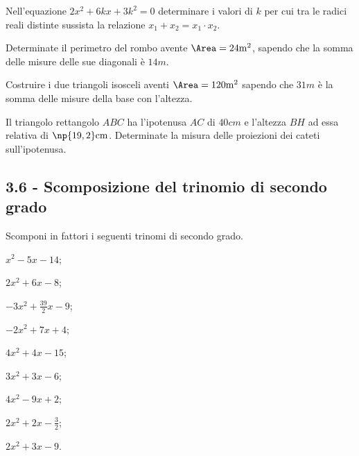 \begin{esercizio}[\Ast]
 \label{ese:3.90}
Nell'equazione $2 x^{2} + 6 k x + 3 k^{2} = 0$ determinare i valori di $k$ per cui tra le radici reali distinte sussista la relazione $x_{1} + x_{2} = x_{1} \cdot x_{2}$.
\end{esercizio}

\begin{esercizio}[\Ast]
 \label{ese:3.91}
Determinate il perimetro del rombo avente $\Area = 24\unit{m^{2}}$, sapendo che la somma delle misure delle sue diagonali è $14\unit{m}$.
\end{esercizio}

\begin{esercizio}
\label{ese:3.92}
Costruire i due triangoli isosceli aventi $\Area = 120\unit{m^{2}}$ sapendo che $31\unit{m}$ è la somma delle misure della base con l'altezza.
\end{esercizio}

\begin{esercizio}
 \label{ese:3.93}
Il triangolo rettangolo $ABC$ ha l'ipotenusa $AC$ di $40\unit{cm}$ e l'altezza $BH$ ad essa relativa di $\np{19,2}\unit{cm}$. Determinate la misura delle proiezioni dei cateti sull'ipotenusa.
\end{esercizio}

\subsection*{3.6 - Scomposizione del trinomio di secondo grado}

\begin{esercizio}[\Ast]
 \label{ese:3.94}
Scomponi in fattori i seguenti trinomi di secondo grado.
\begin{multicols}{3}
\begin{enumeratea}
\item $x^{2}-5 x-14$;
\item $2 x^{2} + 6 x-8$;
\item $- 3 x^{2} + \frac{39}{2} x-9$;
\item $- 2 x^{2} + 7 x + 4$;
\item $4 x^{2} + 4 x-15$;
\item $3 x^{2} + 3 x-6$;
\item $4 x^{2}-9 x + 2$;
\item $2 x^{2} + 2 x - \frac{3}{2}$;
\item $2 x^{2}+3 x -9 $.
\end{enumeratea}
\end{multicols}
\end{esercizio}

